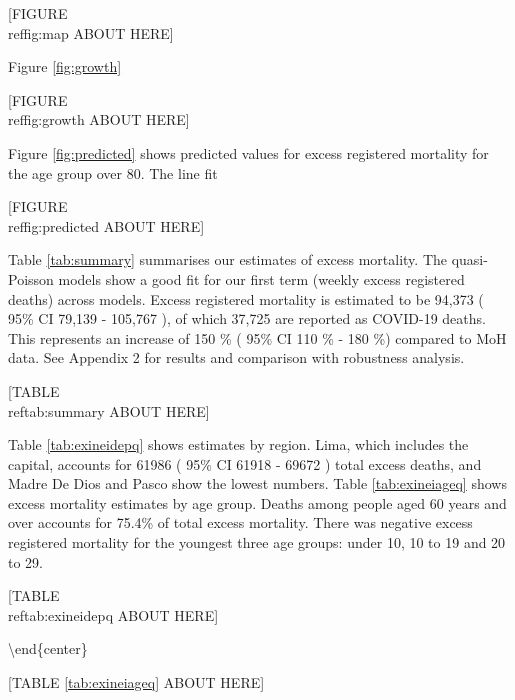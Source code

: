 \documentclass[
]{article}
\begin{document}
\begin{center}
[FIGURE \\ref{fig:map} ABOUT HERE]
\end{center}

Figure \ref{fig:growth}

\begin{center}
[FIGURE \\ref{fig:growth} ABOUT HERE]
\end{center}

Figure \ref{fig:predicted} shows predicted values for excess registered mortality for the age group over 80. The line fit

\begin{center}
        [FIGURE \\ref{fig:predicted} ABOUT HERE]
\end{center}

Table \ref{tab:summary} summarises our estimates of excess mortality. The quasi-Poisson models show a good fit for our first term (weekly excess registered deaths) across models. Excess registered mortality is estimated to be 94,373 ( 95\% CI 79,139 - 105,767 ), of which 37,725 are reported as COVID-19 deaths. This represents an increase of 150 \% ( 95\% CI 110 \% - 180 \%) compared to MoH data. See Appendix 2 for results and comparison with robustness analysis.

\begin{center}
[TABLE \\ref{tab:summary} ABOUT HERE]
\end{center}

Table \ref{tab:exineidepq} shows estimates by region. Lima, which includes the capital, accounts for 61986 ( 95\% CI 61918 - 69672 ) total excess deaths, and Madre De Dios and Pasco show the lowest numbers. Table \ref{tab:exineiageq} shows excess mortality estimates by age group. Deaths among people aged 60 years and over accounts for 75.4\% of total excess mortality. There was negative excess registered mortality for the youngest three age groups: under 10, 10 to 19 and 20 to 29.

\begin{center}

[TABLE \\ref{tab:exineidepq} ABOUT HERE]
        
\end{center}

\textbackslash end\{center\}

{[}TABLE \ref{tab:exineiageq} ABOUT HERE{]}
\end{document}
